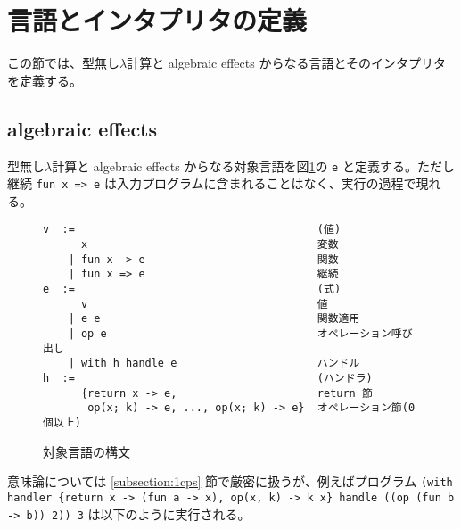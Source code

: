\section{言語とインタプリタの定義}
\label{section:definition}

この節では、型無し$\lambda$計算と algebraic effects からなる言語とそのインタプリタを定義する。

\subsection{algebraic effects}
\label{subsection:algebraic effects}

型無し$\lambda$計算と algebraic effects からなる対象言語を図\ref{figure:abstract_syntax}の \texttt{e} と定義する。ただし継続 \texttt{fun x => e} は入力プログラムに含まれることはなく、実行の過程で現れる。

\begin{figure}
\begin{verbatim}
v  :=                                      (値)
      x                                    変数
    | fun x -> e                           関数
    | fun x => e                           継続
e  :=                                      (式)
      v                                    値
    | e e                                  関数適用
    | op e                                 オペレーション呼び出し
    | with h handle e                      ハンドル
h  :=                                      (ハンドラ)
      {return x -> e,                      return 節
       op(x; k) -> e, ..., op(x; k) -> e}  オペレーション節(0個以上)
\end{verbatim}
\caption{対象言語の構文}
\label{figure:abstract_syntax}
\end{figure}

意味論については \ref{subsection:1cps} 節で厳密に扱うが、例えばプログラム \texttt{(with handler \{return x -> (fun a -> x), op(x, k) -> k x\} handle ((op (fun b -> b)) 2)) 3} は以下のように実行される。

